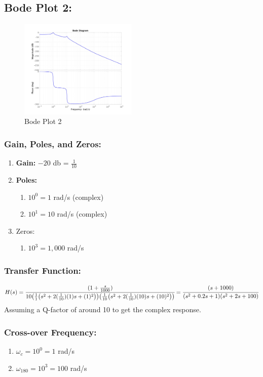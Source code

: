 \documentclass[letter]{article}
\numberwithin{equation}{section}
\begin{document}
\subsection{Bode Plot 2:}
\begin{figure}[ht]
	\centering
	\includegraphics[width=0.5\textwidth]{figs/pblm3b.jpg}
	\caption{Bode Plot 2}
\end{figure}

\subsubsection{Gain, Poles, and Zeros:}
\begin{enumerate}
	\item \textbf{Gain:}  $-20$ db = $\frac{1}{10}$
	\item \textbf{Poles:}
	\begin{enumerate}
		\item $10^{0} = 1$ rad/s (complex)
		\item $10^{1} = 10$ rad/s (complex)
	\end{enumerate}
	\item Zeros:
	\begin{enumerate}
		\item $10^{3} = 1,000$ rad/s
	\end{enumerate}
\end{enumerate}

\subsubsection{Transfer Function:}\[
	H(s) = \cfrac{
			(1 + \frac{s}{1000})
		}{
			10 \qty(
				\frac{1}{1}\qty(s^2 + 2(\frac{1}{10})(1)s + (1)^2)
			) \qty(
				\frac{1}{10}\qty(s^2 + 2(\frac{1}{10})(10)s + (10)^2)
			)
		} = \cfrac{
			(s+1000)
		}{
			\qty(s^2 + 0.2 s + 1) \qty(s^2 + 2s + 100)
		}
\]
Assuming a Q-factor of around 10 to get the complex response.


\subsubsection{Cross-over Frequency:}
\begin{enumerate}
	\item $\omega_c = 10^{0} = 1$ rad/s
	\item $\omega_{180} = 10^{3} = 100$ rad/s
\end{enumerate}
\end{document}
